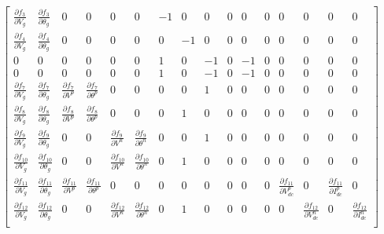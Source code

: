 \documentclass[11pt,fleqn]{book} %
\begin{document}
\begin{equation}
\begin{bmatrix}
\frac{\partial f_3}{\partial V_g} & \frac{\partial f_3}{\partial \theta_g} & 0 & 0 & 0 & 0 & -1 & 0 & 0 & 0 & 0 & 0 & 0 & 0 & 0 & 0\\ 

\frac{\partial f_4}{\partial V_g} & \frac{\partial f_4}{\partial \theta_g} & 0 & 0 & 0 & 0 & 0 & -1 & 0 & 0 & 0 & 0 & 0 & 0 & 0 & 0\\ 

0 & 0 & 0 & 0 & 0 & 0 & 1 & 0 & -1 & 0 & -1 & 0 & 0 & 0 & 0 & 0\\ 

0 & 0 & 0 & 0 & 0 & 0 & 1 & 0 & -1 & 0 & -1 & 0 & 0 & 0 & 0 & 0\\ 

\frac{\partial f_7}{\partial V_g} & \frac{\partial f_7}{\partial \theta_g} & \frac{\partial f_7}{\partial V^p} & \frac{\partial f_7}{\partial \theta^p} & 0 & 0 & 0 & 0 & 1 & 0 & 0 & 0 & 0 & 0 & 0 & 0\\ 

\frac{\partial f_8}{\partial V_g} & \frac{\partial f_8}{\partial \theta_g} & \frac{\partial f_8}{\partial V^p} & \frac{\partial f_8}{\partial \theta^p} & 0 & 0 & 0 & 1 & 0 & 0 & 0 & 0 & 0 & 0 & 0 & 0\\ 

\frac{\partial f_9}{\partial V_g} & \frac{\partial f_9}{\partial \theta_g} & 0 & 0 &  \frac{\partial f_9}{\partial V^n} & \frac{\partial f_9}{\partial \theta^n} & 0 & 0 & 1 & 0 & 0 & 0 & 0 & 0 & 0 & 0\\ 

\frac{\partial f_{10}}{\partial V_g} & \frac{\partial f_{10}}{\partial \theta_g} & 0 & 0 & \frac{\partial f_{10}}{\partial V^n} & \frac{\partial f_{10}}{\partial \theta^n} & 0 & 1 & 0 & 0 & 0 & 0 & 0 & 0 & 0 & 0\\ 

\frac{\partial f_{11}}{\partial V_g} & \frac{\partial f_{11}}{\partial \theta_g} & \frac{\partial f_{11}}{\partial V^p} & \frac{\partial f_{11}}{\partial \theta^p} & 0 & 0 & 0 & 0 & 0 & 0 & 0 & 0 & \frac{\partial f_{11}}{\partial V_{dc}^p} & 0 & \frac{\partial f_{11}}{\partial I_{dc}^p} & 0\\ 

\frac{\partial f_{12}}{\partial V_g} & \frac{\partial f_{12}}{\partial \theta_g} & 0 & 0 & \frac{\partial f_{12}}{\partial V^n} & \frac{\partial f_{12}}{\partial \theta^n} & 0 & 1 & 0 & 0 & 0 & 0 & 0 & \frac{\partial f_{12}}{\partial V_{dc}^n} & 0 & \frac{\partial f_{12}}{\partial I_{dc}^n}\\ 


\end{bmatrix}
\end{equation}
\end{document}
